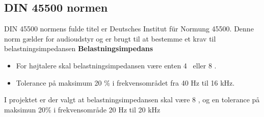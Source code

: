\subsection*{DIN 45500 normen}
\label{DIN45500}
DIN 45500 normens fulde titel er Deutsches Institut f\"{u}r Normung 45500. Denne norm gælder for audioudstyr og er brugt til at bestemme et krav til belastningsimpedansen
\newline 
\newline
\textbf{Belastningsimpedans}
\begin{itemize}
\item For højtalere skal belastningsimpedansen være enten 4 \ohm~eller 8 \ohm.
\item Tolerance på maksimum 20 \% i frekvensområdet fra 40 Hz til 16 kHz.
\end{itemize}
I projektet er der valgt at belastningsimpedansen skal være 8 \ohm, og en tolerance på maksimun 20\% i frekvensområde 20 Hz til 20 kHz